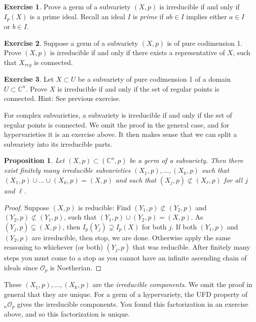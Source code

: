 \documentclass[12pt,openany]{book}
\newcommand{\C}{{\mathbb{C}}}
\newcommand{\sO}{{\mathscr{O}}}
\newcommand{\myindex}[1]{#1\index{#1}}
\theoremstyle{plain}
\newtheorem{prop}[thm]{Proposition}
\theoremstyle{remark}
\theoremstyle{definition}
\newenvironment{exbox}{%
    \def\FrameCommand{\vrule width 1pt \relax\hspace{10pt}}%
    \MakeFramed {\advance \hsize -\width \FrameRestore}%
}{%
    \endMakeFramed
}
\theoremstyle{exercise}
\newtheorem{exercise}{Exercise}[section]
\theoremstyle{example}
\newcommand{\thmref}[1]{\hyperref[#1]{Theorem~\ref*{#1}}}
\begin{document}
\begin{exbox}
\begin{exercise}
Prove a germ of a subvariety $(X,p)$ is irreducible
if and only if $I_p(X)$ is a prime ideal.
Recall an ideal $I$ is \emph{prime}
if $ab \in I$ implies either $a \in I$ or $b
\in I$.
\end{exercise}

\begin{exercise}
Suppose a germ of a subvariety $(X,p)$ is of pure codimension 1.
Prove $(X,p)$ is irreducible if and only if there
exists a representative of $X$, such that $X_{\textit{reg}}$
is connected.  %
\end{exercise}

\begin{exercise}
Let $X \subset U$ be a subvariety of pure codimension 1 of a domain $U
\subset \C^n$.
Prove $X$ is irreducible if and only if the set of regular points
is connected.  Hint: See previous exercise.
\end{exercise}
\end{exbox}

For complex subvarieties, a subvariety is irreducible if
and only if the set of regular points is connected.  We omit the proof
in the general case, and for hypervarieties it is an exercise above.
It then makes sense that we can split a subvariety into its irreducible parts.

\begin{prop}
Let $(X,p) \subset (\C^n,p)$ be a germ of a subvariety.  Then there exist
finitely many irreducible subvarieties $(X_1,p),\ldots,(X_k,p)$ such that
$(X_1,p) \cup \ldots \cup (X_k,p) = (X,p)$ and such that $(X_j,p)
\not\subset (X_\ell,p)$ for all $j$ and $\ell$.
\end{prop}

\begin{proof}
Suppose $(X,p)$ is reducible:
Find $(Y_1,p) \not\subset (Y_2,p)$ and $(Y_2,p) \not\subset (Y_1,p)$,
such that $(Y_1,p) \cup (Y_2,p) = (X,p)$.
As $(Y_j,p) \subsetneq (X,p)$, then
$I_p(Y_j) \supsetneq I_p(X)$ for both $j$.  If both
$(Y_1,p)$ and $(Y_2,p)$ are irreducible, then stop, we are done.  Otherwise
apply the same reasoning to whichever (or both) $(Y_j,p)$ that was
reducible.  After finitely many steps you must come to a stop as you cannot
have an infinite ascending chain of ideals since $\sO_p$ is Noetherian.
\end{proof}

These $(X_1,p),\ldots,(X_k,p)$ are the
\emph{\myindex{irreducible components}}.
We omit the proof in general
that they are unique.
For a germ of a hypervariety,
the UFD property of ${}_{n}\sO_p$ gives the irreducible
components.  You found this factorization in an exercise above,
and so this factorization is unique.
\end{document}
